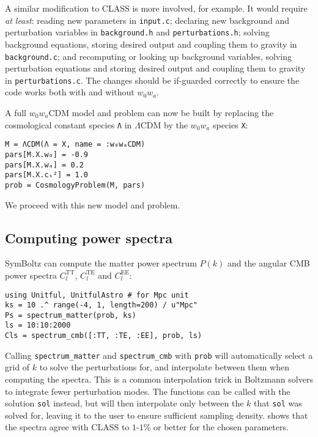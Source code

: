 \documentclass{aa}
\begin{document}
A similar modification to CLASS is more involved, for example.
It would require \emph{at least}: reading new parameters in \texttt{input.c}; declaring new background and perturbation variables in \texttt{background.h} and \texttt{perturbations.h}; solving background equations, storing desired output and coupling them to gravity in \texttt{background.c}; and recomputing or looking up background variables, solving perturbation equations and storing desired output and coupling them to gravity in \texttt{perturbations.c}.
The changes should be if-guarded correctly to ensure the code works both with and without $w_0 w_a$.

A full $w_0 w_a \text{CDM}$ model and problem can now be built by replacing the cosmological constant species \texttt{Λ} in $\Lambda \text{CDM}$ by the $w_0 w_a$ species \texttt{X}:
\begin{codebox}
\begin{Verbatim}
M = ΛCDM(Λ = X, name = :w₀wₐCDM)
pars[M.X.w₀] = -0.9
pars[M.X.wₐ] = 0.2
pars[M.X.cₛ²] = 1.0
prob = CosmologyProblem(M, pars)
\end{Verbatim}
\end{codebox}
We proceed with this new model and problem.

\subsection{Computing power spectra}

SymBoltz can compute the matter power spectrum $P(k)$ and the angular CMB power spectra $C_l^\text{TT}$, $C_l^\text{TE}$ and $C_l^\text{EE}$:
\begin{codebox}
\begin{Verbatim}
using Unitful, UnitfulAstro # for Mpc unit
ks = 10 .^ range(-4, 1, length=200) / u"Mpc"
Ps = spectrum_matter(prob, ks)
ls = 10:10:2000
Cls = spectrum_cmb([:TT, :TE, :EE], prob, ls)
\end{Verbatim}
\end{codebox}
Calling \texttt{spectrum\_matter} and \texttt{spectrum\_cmb} with \texttt{prob} will automatically select a grid of $k$ to solve the perturbations for, and interpolate between them when computing the spectra.
This is a common interpolation trick in Boltzmann solvers to integrate fewer perturbation modes.
The functions can be called with the solution \texttt{sol} instead, but will then interpolate only between the $k$ that \texttt{sol} was solved for, leaving it to the user to ensure sufficient sampling density.
 shows that the spectra agree with CLASS to $1$\textperthousand{}-$1$\% or better for the chosen parameters.
\end{document}

